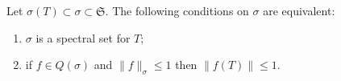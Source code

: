Let $\sigma(T) \subset \sigma \subset \mathfrak{S}$. The following conditions on $\sigma$ are equivalent:
\begin{enumerate}
\item[(a)] $\sigma$ is a spectral set for $T$;
\item[(b)] if $f \in Q(\sigma)$ and $\|f\|_\sigma \leq 1$ then $\|f(T)\| \leq 1$.
\end{enumerate}
